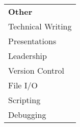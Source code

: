 \begin{minipage}{0.2\textwidth}
\begin{tabular}{l}
	{\large\textbf{Other}} \\
	\highskill Technical Writing \\
	\highskill Presentations \\
	\medhighskill Leadership \\
	\medhighskill Version Control \\
	\medhighskill File I/O \\ 
	\medhighskill Scripting \\ 
	\medskill Debugging \\
\end{tabular}
\end{minipage}%
